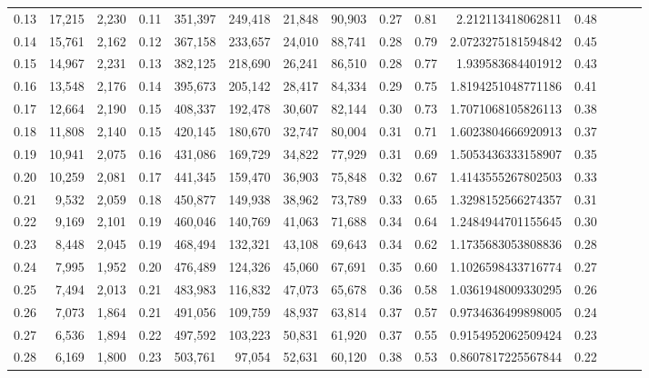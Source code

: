 \begin{tabular}{rrrrrrrrrrrrrrr}
0.13 &  17,215 &  2,230 &  0.11 &  351,397 &  249,418 &   21,848 &   90,903 &  0.27 &  0.81 &     2.212113418062811 &      0.48 \\
0.14 &  15,761 &  2,162 &  0.12 &  367,158 &  233,657 &   24,010 &   88,741 &  0.28 &  0.79 &    2.0723275181594842 &      0.45 \\
0.15 &  14,967 &  2,231 &  0.13 &  382,125 &  218,690 &   26,241 &   86,510 &  0.28 &  0.77 &     1.939583684401912 &      0.43 \\
0.16 &  13,548 &  2,176 &  0.14 &  395,673 &  205,142 &   28,417 &   84,334 &  0.29 &  0.75 &    1.8194251048771186 &      0.41 \\
0.17 &  12,664 &  2,190 &  0.15 &  408,337 &  192,478 &   30,607 &   82,144 &  0.30 &  0.73 &    1.7071068105826113 &      0.38 \\
0.18 &  11,808 &  2,140 &  0.15 &  420,145 &  180,670 &   32,747 &   80,004 &  0.31 &  0.71 &    1.6023804666920913 &      0.37 \\
0.19 &  10,941 &  2,075 &  0.16 &  431,086 &  169,729 &   34,822 &   77,929 &  0.31 &  0.69 &    1.5053436333158907 &      0.35 \\
0.20 &  10,259 &  2,081 &  0.17 &  441,345 &  159,470 &   36,903 &   75,848 &  0.32 &  0.67 &    1.4143555267802503 &      0.33 \\
0.21 &   9,532 &  2,059 &  0.18 &  450,877 &  149,938 &   38,962 &   73,789 &  0.33 &  0.65 &    1.3298152566274357 &      0.31 \\
0.22 &   9,169 &  2,101 &  0.19 &  460,046 &  140,769 &   41,063 &   71,688 &  0.34 &  0.64 &    1.2484944701155645 &      0.30 \\
0.23 &   8,448 &  2,045 &  0.19 &  468,494 &  132,321 &   43,108 &   69,643 &  0.34 &  0.62 &    1.1735683053808836 &      0.28 \\
0.24 &   7,995 &  1,952 &  0.20 &  476,489 &  124,326 &   45,060 &   67,691 &  0.35 &  0.60 &    1.1026598433716774 &      0.27 \\
0.25 &   7,494 &  2,013 &  0.21 &  483,983 &  116,832 &   47,073 &   65,678 &  0.36 &  0.58 &    1.0361948009330295 &      0.26 \\
0.26 &   7,073 &  1,864 &  0.21 &  491,056 &  109,759 &   48,937 &   63,814 &  0.37 &  0.57 &    0.9734636499898005 &      0.24 \\
0.27 &   6,536 &  1,894 &  0.22 &  497,592 &  103,223 &   50,831 &   61,920 &  0.37 &  0.55 &    0.9154952062509424 &      0.23 \\
0.28 &   6,169 &  1,800 &  0.23 &  503,761 &   97,054 &   52,631 &   60,120 &  0.38 &  0.53 &    0.8607817225567844 &      0.22 \\

\end{tabular}
